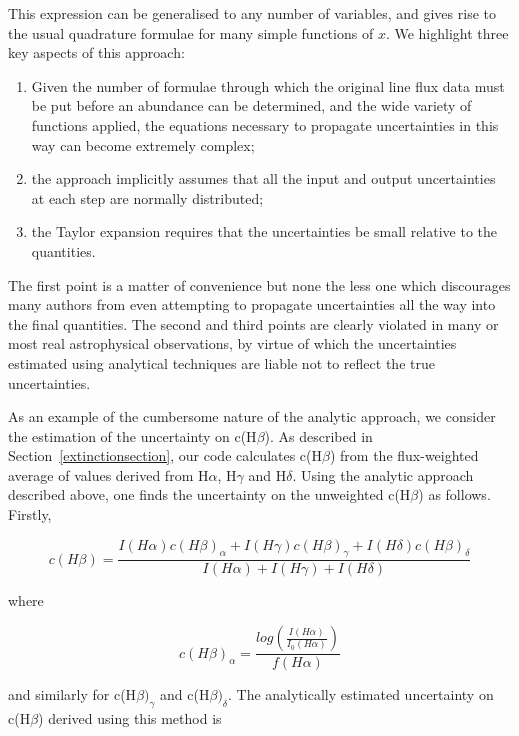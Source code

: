 \documentclass[useAMS,usenatbib]{mn2e}
\begin{document}
This expression can be generalised to any number of variables, and gives rise to the usual quadrature formulae for many simple functions of $x$.  We highlight three key aspects of this approach:

\begin{enumerate}
  \item Given the number of formulae through which the original line flux data must be put before an abundance can be determined, and the wide variety of functions applied, the equations necessary to propagate uncertainties in this way can become extremely complex;
  \item the approach implicitly assumes that all the input and output uncertainties at each step are normally distributed;
  \item the Taylor expansion requires that the uncertainties be small relative to the quantities.
\end{enumerate}

The first point is a matter of convenience but none the less one which discourages many authors from even attempting to propagate uncertainties all the way into the final quantities.  The second and third points are clearly violated in many or most real astrophysical observations, by virtue of which the uncertainties estimated using analytical techniques are liable not to reflect the true uncertainties.

As an example of the cumbersome nature of the analytic approach, we consider the estimation of the uncertainty on c(H$\beta$).  As described in Section~\ref{extinctionsection}, our code calculates c(H$\beta$) from the flux-weighted average of values derived from H$\alpha$, H$\gamma$ and H$\delta$.  Using the analytic approach described above, one finds the uncertainty on the unweighted c(H$\beta$) as follows.  Firstly,

\begin{equation}
c(H\beta) = \frac{I(H\alpha)c(H\beta)_\alpha + I(H\gamma)c(H\beta)_\gamma + I(H\delta)c(H\beta)_\delta}{I(H\alpha) + I(H\gamma) + I(H\delta)}
\end{equation}

where

\begin{equation}
c(H\beta)_\alpha = \frac{log\left(\frac{I(H\alpha)}{I_0(H\alpha)}\right)}{f(H\alpha)}
\end{equation}

and similarly for c(H$\beta)_\gamma$ and c(H$\beta)_\delta$.  The analytically estimated uncertainty on c(H$\beta$) derived using this method is
\end{document}
